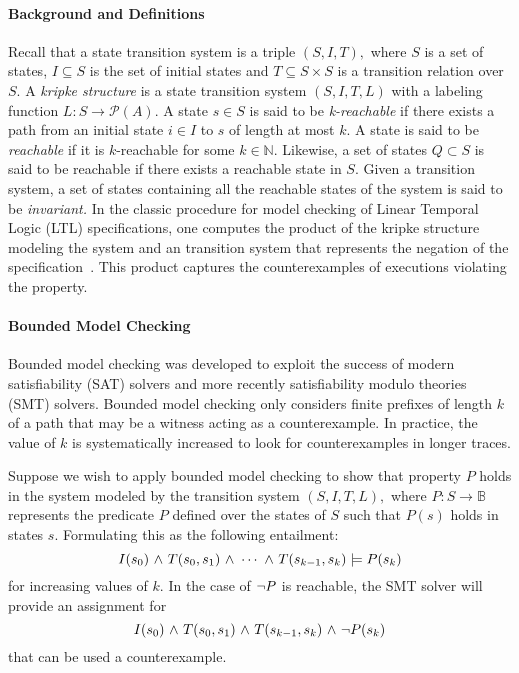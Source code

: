 \paragraph{Background and Definitions} Recall that a state transition system is a triple $(S,I,T),$
where $S$ is a set of states, $I \subseteq S$ is the set of initial
states and $T \subseteq S \times S $ is a transition relation over $S.$ A {\em kripke
  structure} is a state transition system $(S,I,T,L)$  with a labeling function
$L: S \rightarrow  \mathcal{P}(A)$.  A state $s 
\in S$ is said to be {\em k-reachable} if there exists a path from an
initial state $i\in I$ to $s$ of length at most $k.$ A state is said
to be {\em reachable} if it is $k$-reachable for some $k\in \mathbb{N}.$
Likewise, a set of states $Q \subset S$ is said to be reachable if
there exists a reachable state in $S.$  Given a transition system, a
set of states containing all the reachable states of the system is
said to be {\em invariant.} In the classic procedure for model checking of Linear
Temporal Logic (LTL) specifications, one computes the product of
the kripke structure modeling the system and an transition system that
represents the negation of the specification~\cite{ClarkeMC}. This product captures
the counterexamples of executions violating the property. 

\paragraph{Bounded Model Checking} Bounded model checking was developed to exploit the success of modern
satisfiability (SAT) solvers and more recently satisfiability modulo
theories (SMT) solvers. Bounded model checking only considers finite
prefixes of length $k$  of a path that may be a witness acting as a
counterexample. In practice, the value of $k$ is systematically
increased to look for counterexamples in longer traces.  

  
Suppose we wish to apply bounded model checking to show that property
$P$ holds in  the system modeled by the transition
system $(S,I,T,L),$ where $P: S \rightarrow \mathbb{B}$ represents
the predicate $P$ defined over the states of $S$ such that $P(s)$
holds in states $s.$
Formulating this as the following entailment:
$$ I(s_0) {\ \wedge \ } T(s_0,s_1) {\ \wedge \ } \cdots {\ \wedge \ } T(s_{k-1},s_k)
\models P(s_k)$$
for increasing values of $k.$ In the case of ${\neg} P$ is reachable,
the SMT solver will provide an assignment for 
$$I(s_0) {\ \wedge \ } T(s_0,s_1) {\ \wedge \ } T(s_{k-1},s_k) {\ \wedge \ } {\neg}
P(s_k)$$
that can be used a counterexample. 


